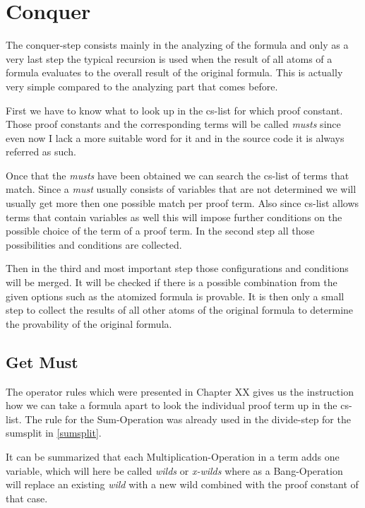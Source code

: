 \section{Conquer}
The conquer-step consists mainly in the analyzing of the formula and only as a very last step the typical recursion is used when the result of all atoms of a formula evaluates to the overall result of the original formula. This is actually very simple compared to the analyzing part that comes before. 

First we have to know what to look up in the cs-list for which proof constant. Those proof constants and the corresponding terms will be called \emph{musts} since even now I lack a more suitable word for it and in the source code it is always referred as such.

Once that the \emph{musts} have been obtained we can search the cs-list of terms that match. Since a \emph{must} usually consists of variables that are not determined we will usually get more then one possible match per proof term. Also since cs-list allows terms that contain variables as well this will impose further conditions on the possible choice of the term of a proof term. In the second step all those possibilities and conditions are collected.

Then in the third and most important step those configurations and conditions will be merged. It will be checked if there is a possible combination from the given options such as the atomized formula is provable. It is then only a small step to collect the results of all other atoms of the original formula to determine the provability of the original formula.


\subsection{Get Must}
The operator rules which were presented in Chapter XX  gives us the instruction how we can take a formula apart to look the individual proof term up in the cs-list. The rule for the Sum-Operation was already used in the divide-step for the sumsplit in \ref{sumsplit}.

It can be summarized that each Multiplication-Operation in a term adds one variable, which will here be called \emph{wilds} or \emph{x-wilds} where as a Bang-Operation will replace an existing \emph{wild} with a new wild combined with the proof constant of that case. 

